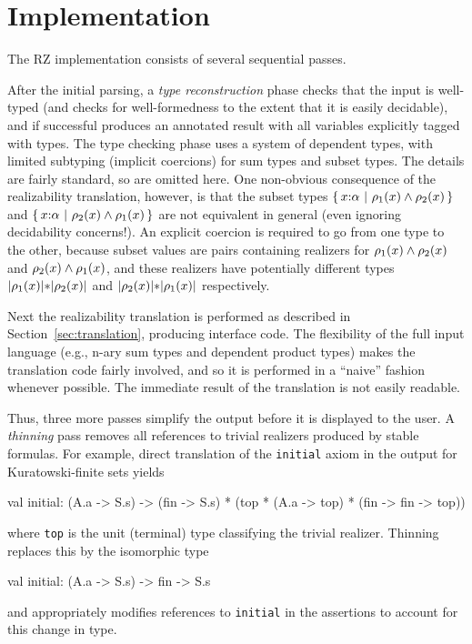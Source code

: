 \section{Implementation}
\label{sec:implementation}

The RZ implementation consists of several sequential passes.

After the initial parsing, a \emph{type reconstruction} phase checks
that the input is well-typed (and checks for well-formedness to the
extent that it is easily decidable), and if successful produces an
annotated result with all variables explicitly tagged with types. The
type checking phase uses a system of dependent types, with limited
subtyping (implicit coercions) for sum types and subset types. The
details are fairly standard, so are omitted here. One non-obvious
consequence of the realizability translation, however, is that the
subset types $\{\,x{:}\alpha\ |\ \rho_1(x)\land \rho_2(x)\,\}$ and
$\{\,x{:}\alpha\ |\ \rho_2(x)\land \rho_1(x)\,\}$ are not
equivalent in general (even ignoring decidability concerns!). An
explicit coercion is required to go from one type to the other,
because subset values are pairs containing realizers for
$\rho_1(x)\land \rho_2(x)$ and
$\rho_2(x)\land \rho_1(x)$, and these realizers have
potentially different types $|\rho_1(x)|\mathtt{*}|\rho_2(x)|$ and
$|\rho_2(x)|\mathtt{*}|\rho_1(x)|$ respectively.

Next the realizability translation is performed as described in
Section~\ref{sec:translation}, producing interface code. The
flexibility of the full input language (e.g., n-ary sum types and
dependent product types) makes the translation code fairly involved,
and so it is performed in a ``naive'' fashion whenever possible. The
immediate result of the translation is not easily readable.
 

Thus, three more passes simplify the output before it is displayed to
the user. A \emph{thinning} pass removes all references to trivial
realizers produced by stable formulas. For example, direct translation
of the \texttt{initial} axiom in the output for Kuratowski-finite sets
yields
\begin{source}
val initial: (A.a -> S.s) -> (fin -> S.s) * (top * (A.a -> top) * (fin -> fin -> top))
\end{source}
where \texttt{top} is the unit (terminal) type classifying the trivial realizer.  Thinning replaces this by the isomorphic type
\begin{source}
val initial: (A.a -> S.s) -> fin -> S.s
\end{source}
and appropriately modifies references to \texttt{initial} in the assertions to account for this change in type.

